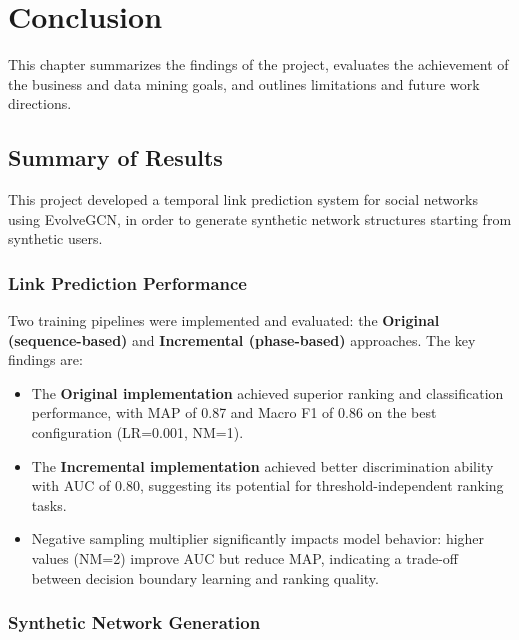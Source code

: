 
\chapter{Conclusion}

This chapter summarizes the findings of the project, evaluates the achievement of the business and data mining goals, and outlines limitations and future work directions.

\section{Summary of Results}

This project developed a temporal link prediction system for social networks using EvolveGCN, in order to generate synthetic network structures starting from synthetic users.

\subsection*{Link Prediction Performance}

Two training pipelines were implemented and evaluated: the \textcolor{drawred}{\textbf{Original (sequence-based)}} and \textcolor{drawblue}{\textbf{Incremental (phase-based)}} approaches. The key findings are:

\begin{itemize}
	\item The \textcolor{drawred}{\textbf{Original implementation}} achieved superior ranking and classification performance, with MAP of 0.87 and Macro F1 of 0.86 on the best configuration (LR=0.001, NM=1).
	\item The \textcolor{drawblue}{\textbf{Incremental implementation}} achieved better discrimination ability with AUC of 0.80, suggesting its potential for threshold-independent ranking tasks.
	\item Negative sampling multiplier significantly impacts model behavior: higher values (NM=2) improve AUC but reduce MAP, indicating a trade-off between decision boundary learning and ranking quality.
\end{itemize}

\subsection*{Synthetic Network Generation}

